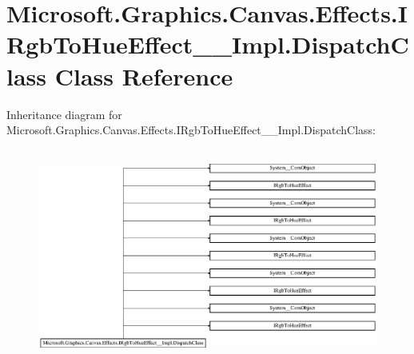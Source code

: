 \hypertarget{class_microsoft_1_1_graphics_1_1_canvas_1_1_effects_1_1_i_rgb_to_hue_effect_____impl_1_1_dispatch_class}{}\section{Microsoft.\+Graphics.\+Canvas.\+Effects.\+I\+Rgb\+To\+Hue\+Effect\+\_\+\+\_\+\+Impl.\+Dispatch\+Class Class Reference}
\label{class_microsoft_1_1_graphics_1_1_canvas_1_1_effects_1_1_i_rgb_to_hue_effect_____impl_1_1_dispatch_class}
Inheritance diagram for Microsoft.\+Graphics.\+Canvas.\+Effects.\+I\+Rgb\+To\+Hue\+Effect\+\_\+\+\_\+\+Impl.\+Dispatch\+Class\+:\begin{figure}[H]
\begin{center}
\leavevmode
\includegraphics[height=7.048055cm]{class_microsoft_1_1_graphics_1_1_canvas_1_1_effects_1_1_i_rgb_to_hue_effect_____impl_1_1_dispatch_class}
\end{center}
\end{figure}
